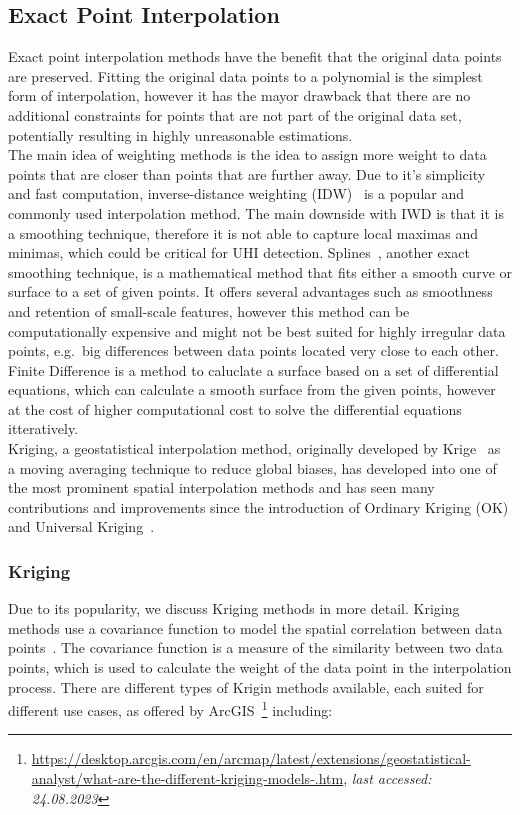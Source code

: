 \subsection{Exact Point Interpolation}

Exact point interpolation methods have the benefit that the original data points are preserved. Fitting the original data points to a polynomial is the simplest form of interpolation, however it has the mayor drawback that there are no additional constraints for points that are not part of the original data set, potentially resulting in highly unreasonable estimations.\\
The main idea of weighting methods is the idea to assign more weight to data points that are closer than points that are further away. Due to it's simplicity and fast computation, inverse-distance weighting (IDW)~\cite{willmott1985small} is a popular and commonly used interpolation method. The main downside with IWD is that it is a smoothing technique, therefore it is not able to capture local maximas and minimas, which could be critical for UHI detection. Splines~\cite{mitavs1988general}, another exact smoothing technique, is a mathematical method that fits either a smooth curve or surface to a set of given points. It offers several advantages such as smoothness and retention of small-scale features, however this method can be computationally expensive and might not be best suited for highly irregular data points, e.g.\ big differences between data points located very close to each other. Finite Difference is a method to caluclate a surface based on a set of differential equations, which can calculate a smooth surface from the given points, however at the cost of higher computational cost to solve the differential equations itteratively.\\
Kriging, a geostatistical interpolation method, originally developed by Krige~\cite{krige1976review} as a moving averaging technique to reduce global biases, has developed into one of the most prominent spatial interpolation methods and has seen many contributions and improvements since the introduction of Ordinary Kriging (OK) and Universal Kriging~\cite{li2014spatial}.

\subsubsection{Kriging}

Due to its popularity, we discuss Kriging methods in more detail. Kriging methods use a covariance function to model the spatial correlation between data points~\cite{wackernagel2003multivariate}. The covariance function is a measure of the similarity between two data points, which is used to calculate the weight of the data point in the interpolation process. There are different types of Krigin methods available, each suited for different use cases, as offered by ArcGIS~\footnote{\url{https://desktop.arcgis.com/en/arcmap/latest/extensions/geostatistical-analyst/what-are-the-different-kriging-models-.htm}, \textit{last accessed: 24.08.2023}} including:

